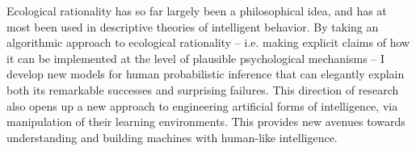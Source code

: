 Ecological rationality has so far largely been a philosophical idea, and has at most been used in descriptive theories of intelligent behavior. By taking an algorithmic approach to ecological rationality -- i.e. making explicit claims of how it can be implemented at the level of plausible psychological mechanisms -- I develop new models for human probabilistic inference that can elegantly explain both its remarkable successes and surprising failures. This direction of research also opens up a new approach to engineering artificial forms of intelligence, via manipulation of their learning environments. This provides new avenues towards understanding and building machines with human-like intelligence.
